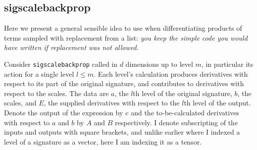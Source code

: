 \subsection{sigscalebackprop}
Here we present a general sensible idea to use when differentiating products of terms sampled with replacement from a list: \emph{you keep the simple code you would have written if replacement was not allowed}.

Consider \verb|sigscalebackprop| called in $d$ dimensions up to level $m$, in particular its action for a single level $l\le m$. Each level's calculation produces derivatives with respect to its part of the original signature, and contributes to derivatives with respect to the scales.
The data are $a$, the $l$th level of the original signature, $b$, the scales, %
 and $E$, the supplied derivatives with respect to the $l$th level of the output.  Denote the output of the expression by $e$ and the to-be-calculated derivatives with respect to $a$ and $b$ by $A$ and $B$ respectively. I denote subscripting of the inputs and outputs with square brackets, and unlike earlier where I indexed a level of a signature as a vector, here I am indexing it as a tensor.
 
